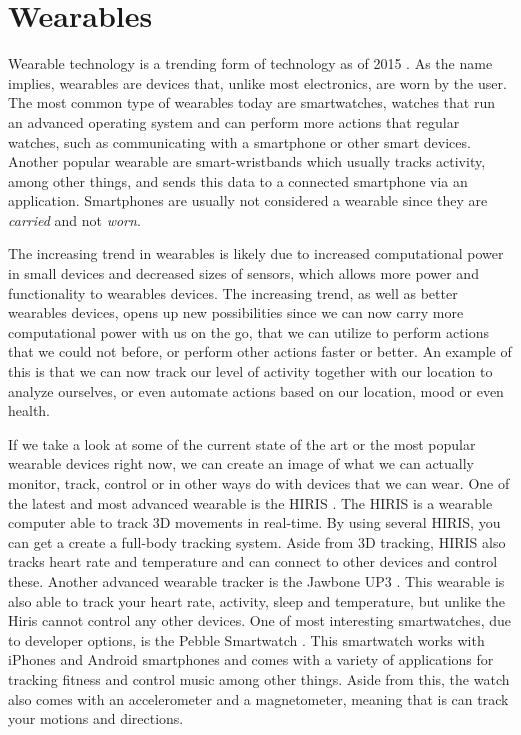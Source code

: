 \section{Wearables}\label{sec:wearables} %
Wearable technology is a trending form of technology as of 2015 \cite{WEARABLESTREND}. 
As the name implies, wearables are devices that, unlike most electronics, are worn by the user. 
The most common type of wearables today are smartwatches, 
\ie watches that run an advanced operating system and can perform more actions that regular watches, 
such as communicating with a smartphone or other smart devices.
Another popular wearable are smart-wristbands which usually tracks activity, 
among other things, and sends this data to a connected smartphone via an application. 
Smartphones are usually not considered a wearable since they are \emph{carried} and not \emph{worn}. 

The increasing trend in wearables is likely due to increased computational power in small devices and decreased sizes of sensors, 
which allows more power and functionality to wearables devices. 
The increasing trend, as well as better wearables devices, 
opens up new possibilities since we can now carry more computational power with us on the go, 
that we can utilize to perform actions that we could not before, 
or perform other actions faster or better. 
An example of this is that we can now track our level of activity together with our location to analyze ourselves, 
or even automate actions based on our location, mood or even health. 

If we take a look at some of the current state of the art or the most popular wearable devices right now, 
we can create an image of what we can actually monitor, track, control or in other ways do with devices that we can wear. 
One of the latest and most advanced wearable is the HIRIS \cite{hirisweb}. 
The HIRIS is a wearable computer able to track 3D movements in real-time. 
By using several HIRIS, you can get a create a full-body tracking system. 
Aside from 3D tracking, HIRIS also tracks heart rate and temperature and can connect to other devices and control these. 
Another advanced wearable tracker is the Jawbone UP3 \cite{JAWBONE}. 
This wearable is also able to track your heart rate, activity, sleep and temperature, but unlike the Hiris cannot control any other devices. 
One of most interesting smartwatches, due to developer options, is the Pebble Smartwatch \cite{PEBBLE}. 
This smartwatch works with iPhones and Android smartphones and comes with a variety of applications for tracking fitness and control music among other things. 
Aside from this, the watch also comes with an accelerometer and a magnetometer, meaning that is can track your motions and directions. 

